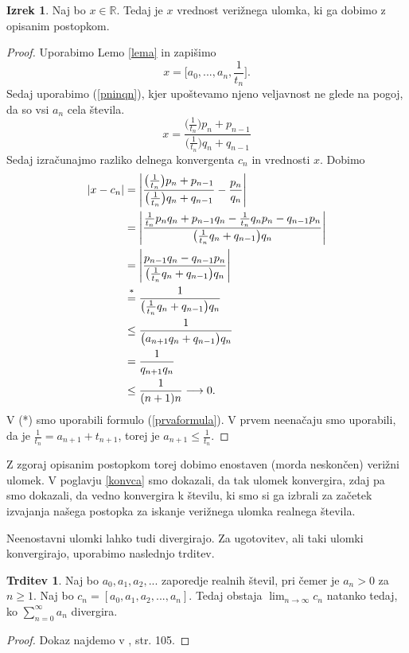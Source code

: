 \documentclass[a4paper,12pt]{article}
\newcommand{\R}{\mathbb{R}}
\newcommand{\equaltext}[1]{\ensuremath{\stackrel{\text{#1}}{=}}}
\theoremstyle{definition}
\theoremstyle{proposition}
\newtheorem{trd}{Trditev}[section]
\theoremstyle{theorem}
\newtheorem{iz}{Izrek}[section]
\theoremstyle{lemma}
\begin{document}
\begin{iz}
\label{postopek}
Naj bo $x \in \R$. Tedaj je $x$ vrednost verižnega ulomka, ki ga dobimo z opisanim postopkom.
\end{iz}
\begin{proof}
Uporabimo Lemo \ref{lema} in zapišimo
\[ x =\big[a_0,..., a_n, \frac{1}{t_n}\big].\]
Sedaj uporabimo (\ref{pninqn}), kjer upoštevamo njeno veljavnost ne glede na pogoj, da so vsi $a_n$ cela števila.
\[x=\frac{\big(\frac{1}{t_n}\big)p_n+p_{n-1}}{\big(\frac{1}{t_n}\big)q_n+q_{n-1}}\]
Sedaj izračunajmo razliko delnega konvergenta $c_n$ in vrednosti $x$. Dobimo
\begin{equation*}
\begin{split}
\left|x-c_n\right|   &=\left|\frac{\big(\frac{1}{t_n}\big)p_n+p_{n-1}}{\big(\frac{1}{t_n}\big)q_n+q_{n-1}}-\frac{p_n}{q_n}\right|\\
&= \left|\frac{\frac{1}{t_n}p_n q_n + p_{n-1}q_n - \frac{1}{t_n}q_n p_n - q_{n-1} p_n}{\big(\frac{1}{t_n}q_n+q_{n-1}\big)q_n}\right| \\
&= \left|\frac{p_{n-1}q_n - q_{n-1} p_n}{\big(\frac{1}{t_n}q_n+q_{n-1}\big)q_n}\right| \\
&\equaltext{\text{*}}{} \frac{1}{\big(\frac{1}{t_n}q_n+q_{n-1}\big)q_n} \\
&\leq \frac{1}{\big(a_{n+1}q_n + q_{n-1}\big)q_n} \\
&= \frac{1}{q_{n+1}q_n} \\
&\leq \frac{1}{(n+1)n} \longrightarrow 0.
\end{split}
\end{equation*}
V (*) smo uporabili formulo (\ref{prvaformula}). V prvem neenačaju smo uporabili, da je $\frac{1}{t_n} = a_{n+1}+t_{n+1}$, torej je $a_{n+1} \leq \frac{1}{t_n}$.
\end{proof}

Z zgoraj opisanim postopkom torej dobimo enostaven (morda neskončen) verižni ulomek. V poglavju \ref{konvca} smo dokazali, da tak ulomek konvergira, zdaj pa smo dokazali, da vedno konvergira k številu, ki smo si ga izbrali za začetek izvajanja našega postopka za iskanje verižnega ulomka realnega števila.\par
Neenostavni ulomki lahko tudi divergirajo. Za ugotovitev, ali taki ulomki konvergirajo, uporabimo naslednjo trditev.

\begin{trd}
\label{divergenca}
Naj bo $a_0, a_1, a_2, ...$ zaporedje realnih števil, pri čemer je $a_n > 0$ za $n\geq1$. Naj bo $c_n = [a_0, a_1, a_2, ..., a_n]$. Tedaj obstaja $\lim_{n\to\infty}c_n$ natanko tedaj, ko $\sum_{n=0}^{\infty}a_n$ divergira.
\end{trd}
\begin{proof}
Dokaz najdemo v \cite{teorijastevil}, str. 105.
\end{proof}
\end{document}
